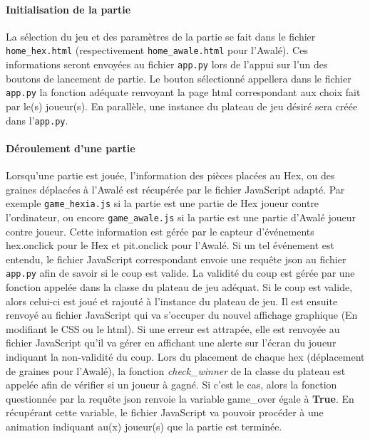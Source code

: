 \paragraph{Initialisation de la partie}
La sélection du jeu et des paramètres de la partie se fait dans le fichier \texttt{home\_hex.html}
(respectivement \texttt{home\_awale.html} pour l'Awalé). Ces informations seront envoyées au fichier \texttt{app.py}
lors de l'appui sur l'un des boutons de lancement de partie. Le bouton sélectionné appellera dans le fichier \texttt{app.py} la 
fonction adéquate renvoyant la page html correspondant aux choix fait par le(s) joueur(s). En parallèle, une instance du plateau de
jeu désiré sera créée dans l'\texttt{app.py}. 

\paragraph{Déroulement d'une partie}
Lorsqu'une partie est jouée, l'information des pièces placées au Hex, ou des graines déplacées à l'Awalé est récupérée par
le fichier JavaScript adapté. Par exemple \texttt{game\_hexia.js} si la partie est une partie de Hex joueur contre l'ordinateur, ou encore 
\texttt{game\_awale.js} si la partie est une partie d'Awalé joueur contre joueur. Cette information est gérée par le capteur d'événements
hex.onclick pour le Hex et pit.onclick pour l'Awalé. Si un tel événement est entendu, le fichier JavaScript correspondant envoie une requête 
json au fichier \texttt{app.py} afin de savoir si le coup est valide. La validité du coup est gérée par une fonction appelée dans la classe du
plateau de jeu adéquat. Si le coup est valide, alors celui-ci est joué et rajouté à l'instance du plateau de jeu. Il est ensuite renvoyé au fichier 
JavaScript qui va s'occuper du nouvel affichage graphique (En modifiant le CSS ou le html). Si une erreur est attrapée, elle est renvoyée
au fichier JavaScript qu'il va gérer en affichant une alerte sur l'écran du joueur indiquant la non-validité du coup. Lors du placement de chaque
hex (déplacement de graines pour l'Awalé), la fonction \textit{check\_winner} de la classe du plateau est appelée afin de vérifier si un joueur à 
gagné. Si c'est le cas, alors la fonction questionnée par la requête json renvoie la variable \textsf{game\_over} égale à \textbf{True}. 
En récupérant cette variable, le fichier JavaScript va pouvoir procéder à une animation indiquant au(x) joueur(s) que la partie est terminée.



